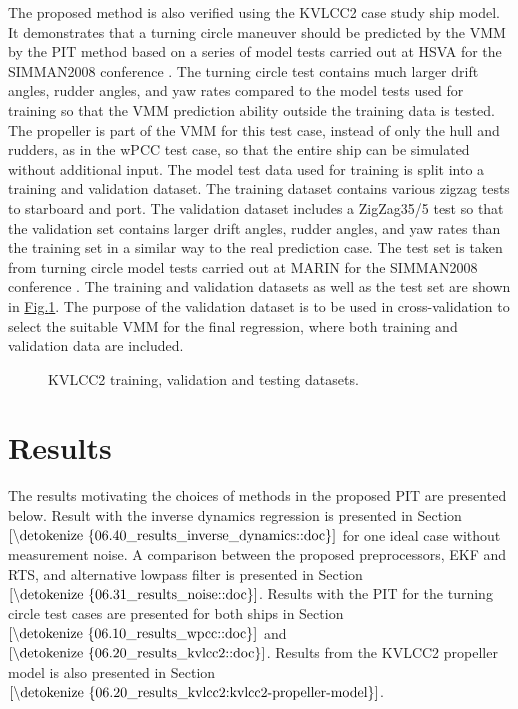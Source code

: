 \documentclass[review]{elsarticle}
\begin{document}
The proposed method is also verified using the KVLCC2 case study ship model. It demonstrates that a turning circle maneuver should be predicted by the VMM by the PIT method based on a series of model tests carried out at HSVA for the SIMMAN2008 conference \cite{stern_experience_2011}. The turning circle test contains much larger drift angles, rudder angles, and yaw rates compared to the model tests used for training so that
the VMM prediction ability outside the training data is tested.
The propeller is part of the VMM for this test case, instead of only the hull and rudders, as in the wPCC test case, so that the entire ship can be simulated without additional input.
The model test data used for training is split into a training and validation dataset. The training dataset contains various zigzag tests to starboard and port. The validation dataset includes a ZigZag35/5 test so that the validation set contains larger drift angles, rudder angles, and yaw rates than the training set in a similar way to the real prediction case. The test set is taken from turning circle model tests carried out at MARIN for the SIMMAN2008 conference \cite{stern_experience_2011}. The training and validation datasets as well as the test set are shown in \hyperref[\detokenize{05.01_case_studies:fig-kvlcc2-traintest}]{Fig.\@ \ref{\detokenize{05.01_case_studies:fig-kvlcc2-traintest}}}.
The purpose of the validation dataset is to be used in cross-validation to select the suitable VMM for the final regression, where both training and validation data are included.

 \begin{figure}[H]
 \centering
 \capstart

 \noindent{}
 \caption{KVLCC2 training, validation and testing datasets.}\label{\detokenize{05.01_case_studies:fig-kvlcc2-traintest}}\end{figure}


\section{Results}
\label{\detokenize{06.01_results:results}}\label{\detokenize{06.01_results:id1}}\label{\detokenize{06.01_results::doc}}
  
The results motivating the choices of methods in the proposed PIT are presented below. Result with the inverse dynamics regression is presented in Section \(\ref{\detokenize{06.40_results_inverse_dynamics::doc}}\) for one ideal case without measurement noise. A comparison between the proposed preprocessors, EKF and RTS, and alternative low\sphinxhyphen{}pass filter is presented in Section \(\ref{\detokenize{06.31_results_noise::doc}}\). Results with the PIT for the turning circle test cases are presented for both ships in Section \(\ref{\detokenize{06.10_results_wpcc::doc}}\) and \(\ref{\detokenize{06.20_results_kvlcc2::doc}}\). Results from the KVLCC2 propeller model is also presented in Section  \(\ref{\detokenize{06.20_results_kvlcc2:kvlcc2-propeller-model}}\).
\end{document}
